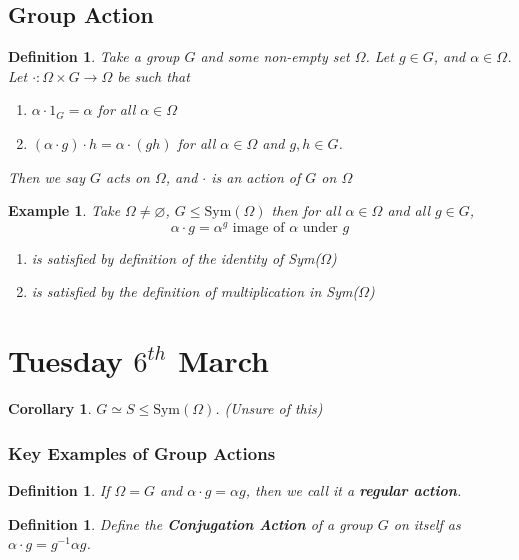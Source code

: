 \documentclass[a4paper,10pt]{article}
\newtheorem{Def}[thm]{Definition}
\newtheorem{Cor}[thm]{Corollary}
\newtheorem{eg}[thm]{Example}
\begin{document}
\subsection{Group Action}
\begin{Def}
Take a group $G$ and some non-empty set $\Omega$. Let $g \in G$, and $\alpha \in \Omega$. Let $\cdot: \Omega \times G \rightarrow \Omega$ be such that 
\begin{enumerate}
\item $\alpha \cdot 1_G = \alpha$ for all $\alpha \in \Omega$ 
\item $(\alpha \cdot g) \cdot h = \alpha \cdot (gh)$ for all $\alpha \in \Omega$ and $g,h \in G$.   
\end{enumerate}
Then we say $G$ acts on $\Omega$, and $\cdot$ is an action of $G$ on $\Omega$
\end{Def}

\begin{eg}
Take $\Omega \neq \varnothing$, $G \leq \text{Sym}(\Omega)$ then for all $\alpha \in \Omega$ and all $g \in G$, 
\[ \alpha \cdot g  = \alpha ^ g \text{ image of $\alpha$ under $g$} \]
\begin{enumerate}
\item is satisfied by definition of the identity of Sym($\Omega$)
\item is satisfied by the definition of multiplication in Sym($\Omega$)
\end{enumerate}
\end{eg}



\newpage
\section{Tuesday $6^{th}$ March}

\begin{Cor}
$G \simeq S \leq \text{Sym} (\Omega)$. (Unsure of this)
\end{Cor}


\subsubsection{Key Examples of Group Actions}

\begin{Def}
If $\Omega = G$ and $\alpha \cdot g = \alpha g$, then we call it a \textbf{regular action}. 
\end{Def}

\begin{Def}
Define the \textbf{Conjugation Action} of a group $G$ on itself as $\alpha \cdot g = g^{-1} \alpha g$.
\end{Def}
\end{document}
